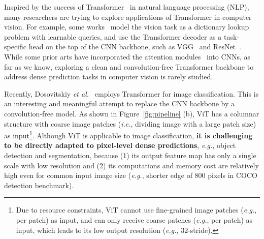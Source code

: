 \documentclass[10pt,twocolumn,letterpaper]{article}
\def\ie{\emph{i.e.}}
\def\eg{\emph{e.g.}}
\def\etal{{\em et al.~}}
\begin{document}
Inspired by the success of Transformer~\cite{vaswani2017attention} in natural language processing (NLP), many researchers are trying to explore  applications of Transformer in computer vision.
For example, some works~\cite{carion2020end,zhu2020deformable,xie2021segmenting,sun2020transtrack,hu2021Transformer} model the vision task as a dictionary lookup problem with learnable queries, and use the Transformer decoder as a task-specific head on the top of the CNN backbone, such as VGG~\cite{simonyan2014very} and ResNet~\cite{he2016deep}.
While some prior arts have incorporated  the attention modules~\cite{wang2018non,ramachandran2019stand,zhao2020exploring} into CNNs, 
as far as we know, exploring a clean and convolution-free Transformer backbone to address dense prediction tasks in computer vision is rarely studied.



Recently, Dosovitskiy \etal\cite{dosovitskiy2020image} employs  Transformer for image classification.
This is an interesting and meaningful attempt to replace the CNN backbone by a convolution-free model. 
As shown in Figure~\ref{fig:pipeline} (b), ViT has a columnar structure with coarse image patches (\ie, dividing image with a large patch size)
as input\footnote{Due to resource constraints, ViT cannot use fine-grained image patches (\eg,  per patch) as input, and can only receive coarse patches (\eg,  per patch) as input, which leads to its low output resolution (\eg, 32-stride).}.
Although ViT is applicable to image classification, \textbf{it is challenging to be directly 
adapted to pixel-level dense predictions}, \eg, object detection and segmentation, because (1) its output feature map has only a single scale with low resolution and (2) its computations and memory cost are relatively high even for common input image size (\eg, shorter edge of 800 pixels in COCO detection benchmark). 
\end{document}
